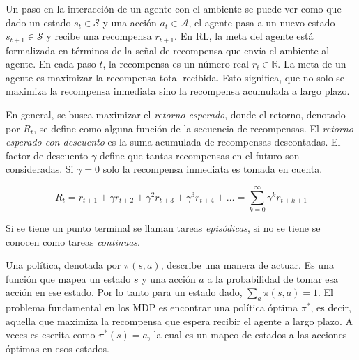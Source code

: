

 Un paso en la interacción de un agente con el ambiente se puede ver como que dado un estado $s_t \in \mathcal{S}$ y una
acción $a_t\in \mathcal{A}$, el agente pasa a un nuevo
estado $s_{t+1} \in \mathcal{S}$ y recibe una recompensa
$r_{t+1}$.
En RL, la meta del agente está formalizada
en términos de la señal de recompensa que
envía el ambiente al agente. En cada paso $t$, la recompensa es un número real $r_t \in \mathbb{R}$. La meta de un agente
es maximizar la recompensa total recibida.
Esto significa, que no solo se maximiza la recompensa inmediata sino la recompensa acumulada a largo plazo.

En general, se busca maximizar el \textit{retorno
esperado}, donde el retorno, denotado por $R_t$, se define como alguna función de la secuencia de recompensas. 
El \textit{retorno esperado con descuento} es la suma acumulada de recompensas descontadas. El factor de descuento $\gamma$
define que tantas recompensas en el 
futuro son consideradas. Si $\gamma = 0$
solo la recompensa inmediata es
tomada en cuenta.

\[
R_t = r_{t+1} + \gamma r_{t+2} + \gamma^2 r_{t+3} + \gamma^3 r_{t+4} + \dots = 
\sum_{k = 0}^\infty \gamma^{k} r_{t+k+1}
\]

Si se tiene un punto terminal se llaman tareas \textit{episódicas}, si no se tiene se conocen como tareas \textit{continuas}.


Una política, denotada por $\pi(s, a)$, describe una manera de actuar. Es una función que mapea un estado $s$ y una acción $a$ a la probabilidad de tomar esa acción en ese estado.
Por lo tanto para un estado dado, 
$\sum_a \pi (s, a) = 1$. El problema fundamental en los MDP es encontrar una política óptima $\pi^*$, es decir, aquella que maximiza la recompensa que espera recibir el agente a largo plazo.
A veces es escrita como $\pi^*(s) = a$, la cual es un mapeo de estados a las acciones óptimas en esos estados.


